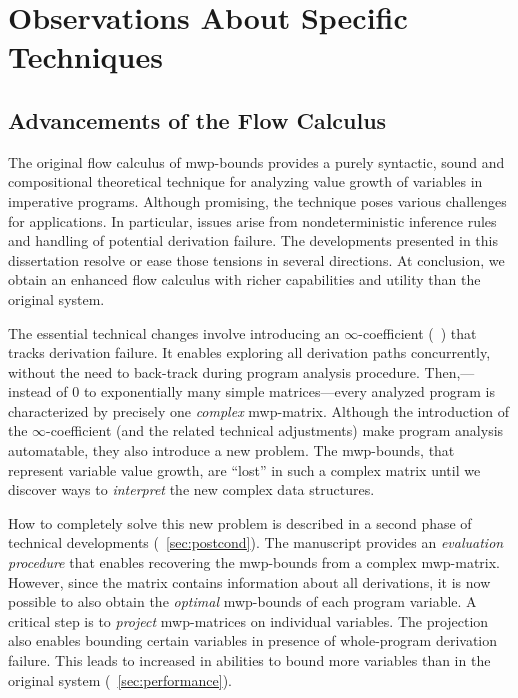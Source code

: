 \section{Observations About Specific Techniques}
\label{sec:res-specific}

\subsection{Advancements of the Flow Calculus}
\label{subsec:res-flow-calc}

The original flow calculus of mwp-bounds provides a purely syntactic, sound and compositional theoretical technique for analyzing value growth of variables in imperative programs.
Although promising, the technique poses various challenges for applications.
In particular, issues arise from nondeterministic inference rules and handling of potential derivation failure.
The developments presented in this dissertation resolve or ease those tensions in several directions.
At conclusion, we obtain an enhanced flow calculus with richer capabilities and utility than the original system.

The essential technical changes involve introducing an \(\infty\)-coefficient (\cf~) that tracks derivation failure.
It enables exploring all derivation paths {concurrently}, \ie without the need to back-track during program analysis procedure.
Then,---instead of 0 to exponentially many simple matrices---every analyzed program is characterized by precisely one \emph{complex} mwp-matrix.
Although the introduction of the \(\infty\)-coefficient (and the related technical adjustments) make program analysis automatable,
they also introduce a new problem.
The mwp-bounds, that represent variable value growth, are \enquote{lost} in such a complex matrix until
we discover ways to \emph{interpret} the new complex data structures.

How to completely solve this new problem is described in a second phase of technical developments (\cf~\autoref{sec:postcond}).
The manuscript provides an \emph{evaluation procedure} that enables recovering the mwp-bounds from a complex mwp-matrix.
However, since the matrix contains information about all derivations, it is now possible to also obtain the \emph{optimal} mwp-bounds of each program variable.
A critical step is to \emph{project} mwp-matrices on individual variables.
The projection also enables bounding certain variables in presence of whole-program derivation failure.
This leads to increased  in abilities to bound more variables than in the original system (\cf~\autoref{sec:performance}).

